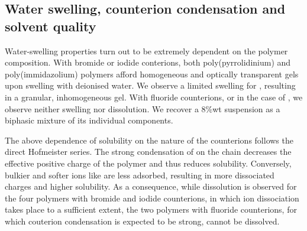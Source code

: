 \documentclass[journal=jacsat,manuscript=article]{achemso}
\begin{document}
\subsection{Water swelling, counterion condensation and solvent quality}
Water-swelling properties turn out to be extremely dependent on the polymer composition. With bromide or iodide conterions, both poly(pyrrolidinium) and poly(immidazolium) polymers afford homogeneous and optically transparent gels upon swelling with deionised water. We observe a limited swelling for , resulting in a granular, inhomogeneous gel. With fluoride counterions, or in the case of , we observe neither swelling nor dissolution. We recover a 8\%wt suspension as a biphasic mixture of its individual components.

The above dependence of solubility on the nature of the counterions follows the direct Hofmeister series. The strong condensation of  on the chain decreases the effective positive charge of the polymer and thus reduces solubility. Conversely, bulkier and softer ions like  are less adsorbed, resulting in more dissociated charges and higher solubility. As a consequence, while dissolution is observed for the four polymers with bromide and iodide counterions, in which ion dissociation takes place to a sufficient extent, the two polymers with fluoride counterions, for which couterion condensation is expected to be strong, cannot be dissolved.
\end{document}
